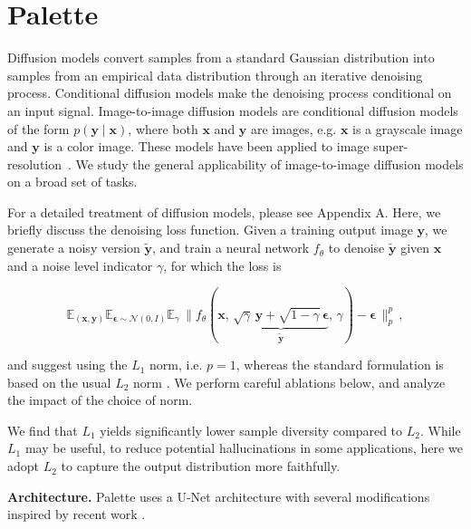 \section{Palette}

Diffusion models \citep{sohl2015deep,ho2020denoising} convert samples from a standard Gaussian distribution into samples from an empirical data distribution through an iterative denoising process. Conditional diffusion models \citep{chen-iclr-2021,saharia2021image} make the denoising process conditional on an input signal. Image-to-image diffusion models are conditional diffusion models of the form $p({\bm{y}} \mid {\bm{x}})$, where both ${\bm{x}}$ and ${\bm{y}}$ are images, e.g. ${\bm{x}}$ is a grayscale image and ${\bm{y}}$ is a color image. These models have been applied to image super-resolution~\citep{saharia2021image, nichol2021improved}. We study the general applicability of image-to-image diffusion models on a broad set of tasks.

For a detailed treatment of diffusion models, please see Appendix A. Here, we briefly discuss the denoising loss function. Given a training output image ${\bm{y}}$, we generate a noisy version $\widetilde{\bm{y}}$, and train a neural network $f_\theta$ to denoise $\widetilde{\bm{y}}$ given ${\bm{x}}$ and a noise level indicator $\gamma$, for which the loss is

\begin{equation}
    \mathbb{E}_{({\bm{x}}, {\bm{y}})} \mathbb{E}_{{\bm{\epsilon}} \sim \mathcal{N}(0, I)} \mathbb{E}_{\gamma}\, \bigg\lVert f_\theta({\bm{x}},\, \underbrace{\sqrt{\gamma} \,{\bm{y}} + \sqrt{1\!-\!\gamma}\, {\bm{\epsilon}}}_{\widetilde{\bm{y}}}, \,\gamma) - {\bm{\epsilon}}\, \bigg\rVert^{p}_p \, ,
\label{eq:main-loss}
\end{equation}

\cite{chen-iclr-2021} and \cite{saharia2021image} suggest using the $L_1$ norm, i.e. $p=1$, whereas the standard formulation is based on the usual $L_2$ norm \citep{ho2020denoising}. We perform careful ablations below, and analyze the impact of the choice of norm.

We find that $L_1$ yields significantly lower sample diversity compared to $L_2$. While $L_1$ may be useful, to reduce potential hallucinations in some applications, here we adopt $L_2$ to capture the output distribution more faithfully.  

\textbf{Architecture.}
Palette uses a U-Net architecture \citep{ho2020denoising} with several  modifications inspired by recent work \citep{song-iclr-2021, saharia2021image, dhariwal2021diffusion}.

